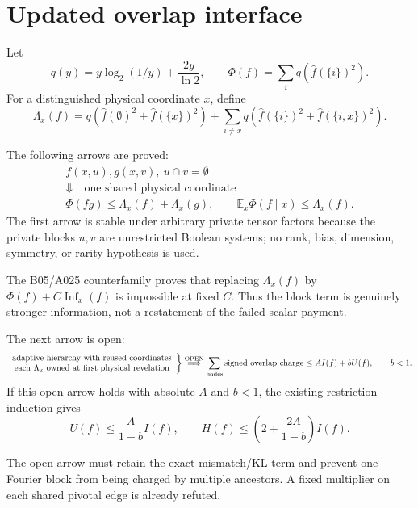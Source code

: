 \section*{Updated overlap interface}

Let
\[
 q(y)=y\log_2(1/y)+\frac{2y}{\ln2},\qquad
 \Phi(f)=\sum_i q(\widehat f(\{i\})^2).
\]
For a distinguished physical coordinate $x$, define
\[
 \Lambda_x(f)=q(\widehat f(\emptyset)^2+\widehat f(\{x\})^2)
 +\sum_{i\ne x}q(\widehat f(\{i\})^2+
                         \widehat f(\{i,x\})^2).
\]

The following arrows are proved:
\[
 \begin{array}{c}
 f(x,u),g(x,v),\ u\cap v=\emptyset
 \\
 \Downarrow\quad\text{one shared physical coordinate}
 \\
 \Phi(fg)\le\Lambda_x(f)+\Lambda_x(g),
 \qquad
 \mathbb E_{x}\Phi(f\mid x)\le\Lambda_x(f).
 \end{array}
\]
The first arrow is stable under arbitrary private tensor factors because the
private blocks $u,v$ are unrestricted Boolean systems; no rank, bias,
dimension, symmetry, or rarity hypothesis is used.

The B05/A025 counterfamily proves that replacing $\Lambda_x(f)$ by
$\Phi(f)+C\operatorname{Inf}_x(f)$ is impossible at fixed $C$. Thus the block
term is genuinely stronger information, not a restatement of the failed
scalar payment.

The next arrow is open:
\[
 \left.
 \begin{array}{c}
 \text{adaptive hierarchy with reused coordinates}\cr
 \text{each }\Lambda_x\text{ owned at first physical revelation}
 \end{array}
 \right\}
 \stackrel{\rm OPEN}{\Longrightarrow}
 \sum_{\rm nodes}\text{signed overlap charge}
 \le A I(f)+bU(f),\qquad b<1.
\]
If this open arrow holds with absolute $A$ and $b<1$, the existing restriction
induction gives
\[
 U(f)\le\frac{A}{1-b}I(f),\qquad
 H(f)\le\left(2+\frac{2A}{1-b}\right)I(f).
\]

The open arrow must retain the exact mismatch/KL term and prevent one Fourier
block from being charged by multiple ancestors. A fixed multiplier on each
shared pivotal edge is already refuted.

